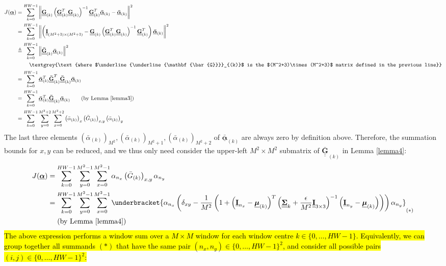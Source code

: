 \documentclass{article}
\def\vt#1{\underline{\mathbf{#1}}}
\def\vts#1{\underline{\boldsymbol{#1}}}
\def\mt#1{\underline{\underline{\mathbf{#1}}}}
\def\mts#1{\underline{\underline{\boldsymbol{#1}}}}
\begin{document}
\begin{align*}
    J(\vts\alpha) &=  \sum_{k=0}^{HW-1} \left\| \mt G_{(k)}\left(\mt G_{(k)}^T \mt G_{(k)} \right)^{-1} \mt G_{(k)}^T \vts{\bar{\alpha}}_{(k)}  - \vts{\bar{\alpha}}_{(k)} \right\|^2\\
    &=  \sum_{k=0}^{HW-1} \left\| \left(\mt I_{(M^2+3)\times(M^2+3)} -  \mt G_{(k)}\left(\mt G_{(k)}^T \mt G_{(k)} \right)^{-1} \mt G_{(k)}^T \right) \vts{\bar{\alpha}}_{(k)}   \right\|^2\\
    &\triangleq  \sum_{k=0}^{HW-1} \left\| \mt{\bar{G}}_{(k)} \vts{\bar{\alpha}}_{(k)}   \right\|^2\\
    &\quad\quad\ \textgrey{\text{where $\mt{\bar{G}}_{(k)}$ is the $(M^2+3)\times(M^2+3)$ matrix defined in the previous line}}\\
    &= \sum_{k=0}^{HW-1} \vts{\bar{\alpha}}_{(k)}^T \mt{\bar{G}}_{(k)}^T \mt{\bar{G}}_{(k)} \vts{\bar{\alpha}}_{(k)}\\
    &= \sum_{k=0}^{HW-1} \vts{\bar{\alpha}}_{(k)}^T  \mt{\bar{G}}_{(k)} \vts{\bar{\alpha}}_{(k)} \qquad\text{(by Lemma \ref{lemma3})}\\
    &= \sum_{k=0}^{HW-1} \sum_{y=0}^{M^2+2} \sum_{x=0}^{M^2+2} \left({\bar{\alpha}}_{(k)}\right)_x  \left({\bar{G}}_{(k)}\right)_{x,y} \left({\bar{\alpha}}_{(k)}\right)_y
\end{align*}
The last three elements $\left({\bar{\alpha}}_{(k)}\right)_{M^2}, \left({\bar{\alpha}}_{(k)}\right)_{M^2+1}, \left({\bar{\alpha}}_{(k)}\right)_{M^2+2}$ of $\vts{\bar{\alpha}}_{(k)}$ are always zero by definition above. Therefore, the summation bounds for $x,y$ can be reduced, and we thus only need consider the upper-left $M^2\times M^2$ submatrix of ${\mt{\bar{G}}}_{(k)}$ in Lemma \ref{lemma4}:
\begin{align*}
    J(\vts\alpha) &= \sum_{k=0}^{HW-1} \sum_{y=0}^{M^2-1} \sum_{x=0}^{M^2-1} \alpha_{n_x}  \left({\bar{G}}_{(k)}\right)_{x,y} \alpha_{n_y}\\
    &= \sum_{k=0}^{HW-1} \sum_{y=0}^{M^2-1} \sum_{x=0}^{M^2-1} \underbracket{\alpha_{n_x}  \left( \delta_{xy} - \frac1{M^2}\left(1 + \left(\vt{I}_{n_x} - \vts \mu_{(k)}\right)^T \left(\mts \Sigma_k + \frac\epsilon{M^2} \mt{I}_{3\times 3}\right)^{-1} \left(\vt{I}_{n_y} - \vts \mu_{(k)}\right) \right) \right) \alpha_{n_y}}_{(*)}\\
    &\quad\ \text{(by Lemma \ref{lemma4})}
\end{align*}
\hl{The above expression performs a window sum over a $M\times M$ window for each window centre $k\in\{0,\dots,HW-1\}$. Equivalently, we can group together all summands $(*)$ that have the same pair $(n_x,n_y)\in\{0,\dots,HW-1\}^2$, and consider all possible pairs $(i,j)\in\{0,\dots,HW-1\}^2$:}
\end{document}
